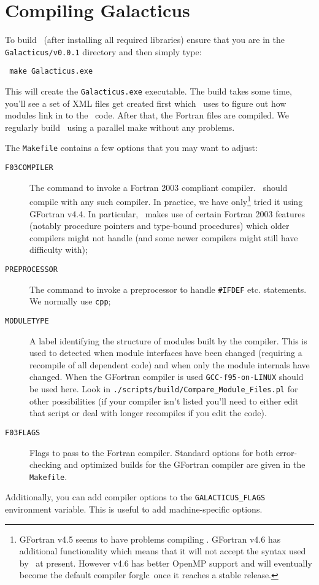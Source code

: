 \section{Compiling Galacticus}

To build \glc\ (after installing all required libraries) ensure that you are in the {\tt Galacticus/v0.0.1} directory and then simply type:
\begin{verbatim}
 make Galacticus.exe
\end{verbatim}
This will create the {\tt Galacticus.exe} executable. The build takes some time, you'll see a set of XML files get created first which \glc\ uses to figure out how modules link in to the \glc\ code. After that, the Fortran files are compiled. We regularly build \glc\ using a parallel make without any problems.

The {\tt Makefile} contains a few options that you may want to adjust:
\begin{description}
 \item[{\tt F03COMPILER}] The command to invoke a Fortran 2003 compliant compiler. \glc\ should compile with any such compiler. In practice, we have only\footnote{{\sc GFortran} v4.5 seems to have problems compiling \glc. {\sc GFortran} v4.6 has additional functionality which means that it will not accept the syntax used by \glc\ at present. However v4.6 has better OpenMP support and will eventually become the default compiler forglc\ once it reaches a stable release.} tried it using {\sc GFortran} v4.4. In particular, \glc\ makes use of certain Fortran 2003 features (notably procedure pointers and type-bound procedures) which older compilers might not handle (and some newer compilers might still have difficulty with);
 \item[{\tt PREPROCESSOR}] The command to invoke a preprocessor to handle {\tt \#IFDEF} etc. statements. We normally use {\tt cpp};
 \item[{\tt MODULETYPE}] A label identifying the structure of modules built by the compiler. This is used to detected when module interfaces have been changed (requiring a recompile of all dependent code) and when only the module internals have changed. When the {\sc GFortran} compiler is used {\tt GCC-f95-on-LINUX} should be used here. Look in {\tt ./scripts/build/Compare\_Module\_Files.pl} for other possibilities (if your compiler isn't listed you'll need to either edit that script or deal with longer recompiles if you edit the code).
 \item[{\tt F03FLAGS}] Flags to pass to the Fortran compiler. Standard options for both error-checking and optimized builds for the {\sc GFortran} compiler are given in the {\tt Makefile}.
\end{description}
Additionally, you can add compiler options to the {\tt GALACTICUS\_FLAGS} environment variable. This is useful to add machine-specific options.

